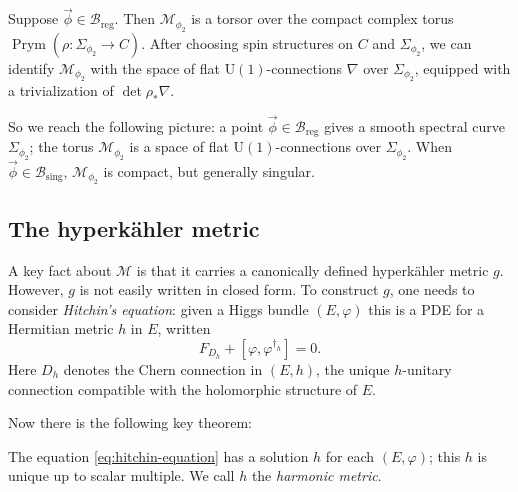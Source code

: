 \documentclass[12pt,letterpaper,reqno]{article}
\numberwithin{equation}{section}
\begin{document}
\begin{prop}
Suppose $\vec\phi \in \mathcal B_\mathrm{reg}$.
Then $\mathcal M_{\phi_2}$ is a torsor over the compact complex torus $\operatorname{Prym} (\rho: \Sigma_{\phi_2} \to C)$. 
After choosing spin structures on 
$C$ and $\Sigma_{\phi_2}$, we can identify $\mathcal M_{\phi_2}$ with the space of flat $\mathrm{U}(1)$-connections $\nabla$ over $\Sigma_{\phi_2}$, equipped with a trivialization of $\det \rho_* \nabla$.
\end{prop}

So we reach the following picture: a point $\vec\phi \in \mathcal B_\mathrm{reg}$
gives a smooth spectral curve $\Sigma_{\phi_2}$; the torus
$\mathcal M_{\phi_2}$ is a space of flat $\mathrm{U}(1)$-connections
over $\Sigma_{\phi_2}$.
When $\vec\phi \in \mathcal B_\mathrm{sing}$, $\mathcal M_{\phi_2}$ is compact,
but generally singular.

\subsection{The hyperk\"ahler metric}

A key fact about $\mathcal M$ is that it carries a canonically
defined hyperk\"ahler metric $g$. However, $g$ is not easily
written in closed form.
To construct $g$, one needs to consider \textit{Hitchin's equation}:
given a Higgs bundle $(E,\varphi)$ this is a PDE
for a Hermitian metric $h$ in $E$, written
\begin{equation} \label{eq:hitchin-equation}
  F_{D_h} + [\varphi, \varphi^{\dagger_h}] = 0.
\end{equation}
Here $D_h$ denotes the Chern connection in $(E,h)$,
the unique $h$-unitary connection compatible with
the holomorphic structure of $E$.

Now there is the following key theorem:
\begin{thm} \label{thm:hitchin-existence}
The equation \eqref{eq:hitchin-equation} has a solution $h$ for each $(E,\varphi)$;
this $h$ is unique up to scalar multiple.
We call $h$ the \textit{harmonic metric}.
\end{thm}
\end{document}
